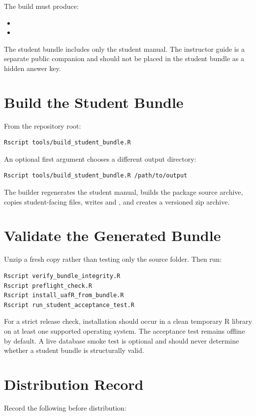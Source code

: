 The build must produce:

\begin{itemize}
  \item {}
  \item {}
\end{itemize}

The student bundle includes only the student manual. The instructor guide is a
separate public companion and should not be placed in the student bundle as a
hidden answer key.

\section{Build the Student Bundle}
From the repository root:

\begin{verbatim}
Rscript tools/build_student_bundle.R
\end{verbatim}

An optional first argument chooses a different output directory:

\begin{verbatim}
Rscript tools/build_student_bundle.R /path/to/output
\end{verbatim}

The builder regenerates the student manual, builds the package source archive,
copies student-facing files, writes  and
, and creates a versioned zip archive.

\section{Validate the Generated Bundle}
Unzip a fresh copy rather than testing only the source folder. Then run:

\begin{verbatim}
Rscript verify_bundle_integrity.R
Rscript preflight_check.R
Rscript install_uafR_from_bundle.R
Rscript run_student_acceptance_test.R
\end{verbatim}

For a strict release check, installation should occur in a clean temporary R
library on at least one supported operating system. The acceptance test remains
offline by default. A live database smoke test is optional and should never
determine whether a student bundle is structurally valid.

\section{Distribution Record}
Record the following before distribution:

